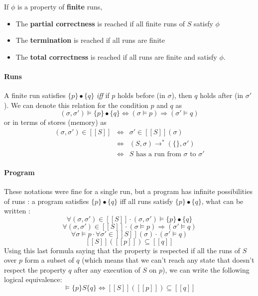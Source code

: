 \documentclass[12pt, a4paper]{book}
\begin{document}
If $\phi$ is a property of \textbf{finite} runs,

\begin{itemize}
    \item The \textbf{partial correctness} is reached if all finite runs of $S$
    satisfy $\phi$
    \item The \textbf{termination} is reached if all runs are finite
    \item The \textbf{total correctness} is reached if all runs are finite and
    satisfy $\phi$.
\end{itemize}

\paragraph{Runs} A finite run satisfies $\{p\}\bullet\{q\}$ \textit{iff} if $p$
holds before (in $\sigma$), then $q$ holds after (in $\sigma'$). We can denote
this relation for the condition $p$ and $q$ as
$$
(\sigma, \sigma') \vDash \{p\}\bullet\{q\} \iff (\sigma\vDash p) \Rightarrow
(\sigma' \vDash q)
$$
or in terms of stores (memory) as
\begin{eqnarray*}
    (\sigma,\sigma') \in [[S]] & \iff & \sigma' \in [[S]](\sigma) \\
    & \iff & (S,\sigma) \longrightarrow^{*} (\{\}, \sigma') \\
    & \iff & S \textrm{ has a run from } \sigma \textrm{ to } \sigma'
\end{eqnarray*}

\paragraph{Program} These notations were fine for a single run, but a program
has infinite possibilities of runs : a program satisfies $\{p\}\bullet\{q\}$ iff
all runs satisfy $\{p\}\bullet\{q\}$, what can be written :
$$
\forall (\sigma,\sigma') \in [[S]] \cdot (\sigma,\sigma') \vDash \{p\}\bullet\{q\}
$$
$$
\forall(\sigma,\sigma') \in [[S]] \cdot (\sigma \vDash p) \Rightarrow (\sigma'\vDash q)
$$
$$
\forall\sigma \vDash p \cdot \forall\sigma'\in[[S]](\sigma)\cdot(\sigma'\vDash q)
$$
$$
[[S]]([[p]]) \subseteq [[q]]
$$
Using this last formula saying that the property is respected if all the runs of
$S$ over $p$ form a subset of $q$ (which means that we can't reach any state
that doesn't respect the property $q$ after any execution of $S$ on $p$), we
can write the following logical equivalence:
$$
\vDash \{p\} S \{q\} \iff [[S]]([[p]]) \subseteq [[q]]
$$
\end{document}
